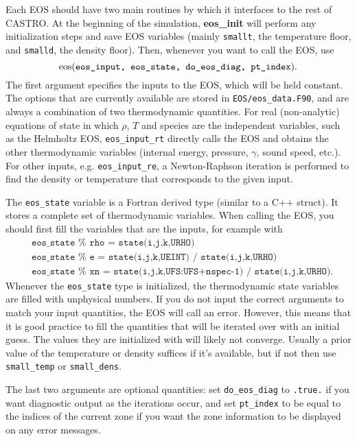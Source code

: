 Each EOS should have two main routines by which it interfaces to the rest of CASTRO.
At the beginning of the simulation, {\bf \rm eos\_init} will perform any initialization steps and save EOS variables (mainly \texttt{smallt}, the temperature floor, and \texttt{smalld}, the density floor). Then, whenever you want to call the EOS, use
\[
{\bf \rm eos}(\texttt{eos\_input, eos\_state, do\_eos\_diag, pt\_index}).
\]
The first argument specifies the inputs to the EOS, which will be held constant. The options that are currently available are stored in \texttt{EOS/eos\_data.F90}, and are always a combination of two thermodynamic quantities. For real (non-analytic) equations of state in which $\rho$, $T$ and species are the independent variables, such as the Helmholtz EOS, \texttt{eos\_input\_rt} directly calls the EOS and obtains the other thermodynamic variables (internal energy, pressure, $\gamma$, sound speed, etc.). For other inputs, e.g. \texttt{eos\_input\_re}, a Newton-Raphson iteration is performed to find the density or temperature that corresponds to the given input.

The \texttt{eos\_state} variable is a Fortran derived type (similar to a C++ struct). It stores a complete set of thermodynamic variables. When calling the EOS, you should first fill the variables that are the inputs, for example with
\begin{align*}
  &\texttt{eos\_state } \% \texttt{ rho = state(i,j,k,URHO)} \\
  &\texttt{eos\_state } \% \texttt{ e   = state(i,j,k,UEINT) / state(i,j,k,URHO)} \\
  &\texttt{eos\_state } \% \texttt{ xn  = state(i,j,k,UFS:UFS+nspec-1) / state(i,j,k,URHO)}.
\end{align*}
Whenever the \texttt{eos\_state} type is initialized, the thermodynamic state variables are filled with unphysical numbers. If you do not input the correct arguments to match your input quantities, the EOS will call an error. However, this means that it is good practice to fill the quantities that will be iterated over with an initial guess. The values they are initialized with will likely not converge. Usually a prior value of the temperature or density suffices if it's available, but if not then use \texttt{small\_temp} or \texttt{small\_dens}.

The last two arguments are optional quantities: set \texttt{do\_eos\_diag} to \texttt{.true.} if you want diagnostic output as the iterations occur, and set \texttt{pt\_index} to be equal to the indices of the current zone if you want the zone information to be displayed on any error messages.

